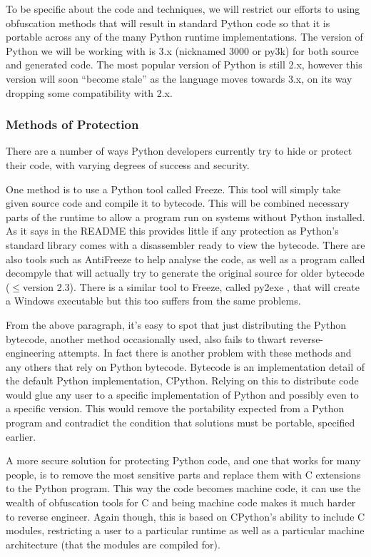\documentclass{report}
\begin{document}
To be specific about the code and techniques, we will restrict our efforts to using obfuscation methods that will
result in standard Python code so that it is portable across any of the many Python runtime implementations. The version
of Python we will be working with is 3.x (nicknamed 3000 or py3k) for both source and generated code. The most popular
version of Python is still 2.x, however this version will soon ``become stale'' as the language moves towards 3.x, on its way
dropping some compatibility with 2.x.

\subsubsection{Methods of Protection}

There are a number of ways Python developers currently try to hide or protect their code, with varying degrees
of success and security.

One method is to use a Python tool called Freeze. This tool will simply take given source code and compile
it to bytecode. This will be combined necessary parts of the runtime to allow a program run
on systems without Python installed. As it says in the README \cite{freezereadme} this provides little if any
protection as Python's standard library comes with a disassembler ready to view the bytecode. There are also
tools such as AntiFreeze \cite{pirates} to help analyse the code, as well as a program called
decompyle \cite{decompyle} that will actually try to generate the original source for older bytecode ($\le$version
2.3). There is a similar tool to Freeze, called py2exe \cite{py2exe}, that will create a Windows executable but
this too suffers from the same problems.

From the above paragraph, it's easy to spot that just distributing the Python bytecode, another method occasionally
used, also fails to thwart reverse-engineering attempts. In fact there is another problem
with these methods and any others that rely on Python bytecode. Bytecode is an implementation detail \cite{dis}
of the default Python implementation, CPython. Relying on this to distribute code would glue any
user to a specific implementation of Python and possibly even to a specific version. This would remove the portability
expected from a Python program and contradict the condition that solutions must be portable, specified earlier.

A more secure solution for protecting Python code, and one that works for many people, is to remove the most
sensitive parts and replace them with C extensions to the Python program. This way the code becomes machine
code, it can use the wealth of obfuscation tools for C and being machine code makes it much
harder to reverse engineer. Again though, this is based on CPython's ability to include C modules, restricting a
user to a particular runtime as well as a particular machine architecture (that the modules are compiled for).
\end{document}

